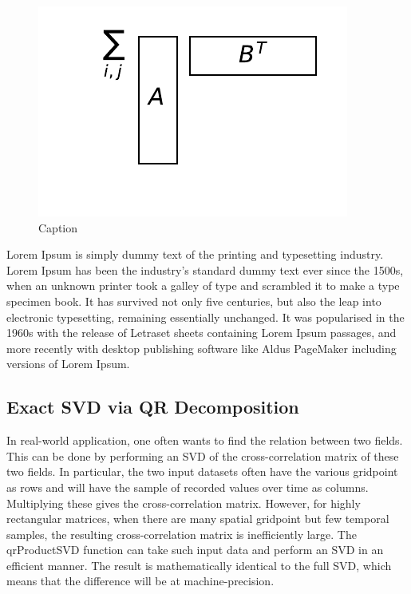 \documentclass{acm_proc_article-sp}
\begin{document}
\begin{figure}[h]
\begin{center}
\includegraphics[scale=0.25]{Results/normDifferenceFromUSVs.pdf}
\caption[Small caption]{Caption}
\label{fig:normDifferenceFromUSVs}
\end{center}
\end{figure}

Lorem Ipsum is simply dummy text of the printing and typesetting industry. Lorem Ipsum has been the industry's standard dummy text ever since the 1500s, when an unknown printer took a galley of type and scrambled it to make a type specimen book. It has survived not only five centuries, but also the leap into electronic typesetting, remaining essentially unchanged. It was popularised in the 1960s with the release of Letraset sheets containing Lorem Ipsum passages, and more recently with desktop publishing software like Aldus PageMaker including versions of Lorem Ipsum.

\subsection{Exact SVD via QR Decomposition}
\label{sec:Techniques Exact SVD via QR Decomposition}

In real-world application, one often wants to find the relation between two fields. This can be done by performing an SVD of the cross-correlation matrix of these two fields. In particular, the two input datasets often have the various gridpoint as rows and will have the sample of recorded values over time as columns. Multiplying these gives the cross-correlation matrix. However, for highly rectangular matrices, when there are many spatial gridpoint but few temporal samples, the resulting cross-correlation matrix is inefficiently large. The qrProductSVD function can take such input data and perform an SVD in an efficient manner. The result is mathematically identical to the full SVD, which means that the difference will be at machine-precision.
\end{document}
